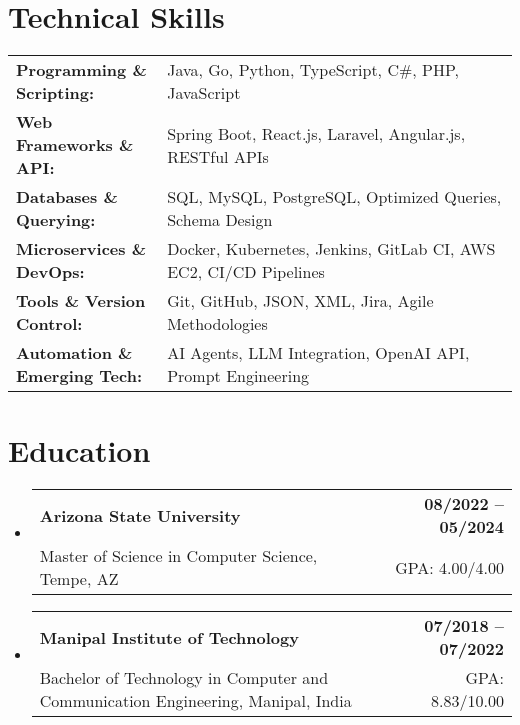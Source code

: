 \documentclass[letterpaper,11pt]{article}
\makeatletter
\newcommand{\educationSubheading}[4]{
  \vspace{-2pt}\item
    \begin{tabular*}{1.0\textwidth}[t]{l@{\extracolsep{\fill}}r}
      \textbf{\small #1} & \textbf{\small #2} \\
      {\small#3} & {\small #4} \\
    \end{tabular*}\vspace{-7pt}
}
\newcommand{\resumeSubHeadingListStart}{\begin{itemize}[leftmargin=0pt, label={}]}
\newcommand{\resumeSubHeadingListEnd}{\end{itemize}}
\makeatother
\begin{document}
\section{Technical Skills}
        \vspace{-14pt}
        \begin{table}[h]
            \footnotesize
            \begin{tabular}{p{0.3\linewidth} p{0.7\linewidth}}
                \textbf{Programming \& Scripting:} & Java, Go, Python, TypeScript, C\#, PHP, JavaScript \\
                \textbf{Web Frameworks \& API:} & Spring Boot, React.js, Laravel, Angular.js, RESTful APIs \\
                \textbf{Databases \& Querying:} & SQL, MySQL, PostgreSQL, Optimized Queries, Schema Design \\
                \textbf{Microservices \& DevOps:} & Docker, Kubernetes, Jenkins, GitLab CI, AWS EC2, CI/CD Pipelines \\
                \textbf{Tools \& Version Control:} & Git, GitHub, JSON, XML, Jira, Agile Methodologies \\
                \textbf{Automation \& Emerging Tech:} & AI Agents, LLM Integration, OpenAI API, Prompt Engineering \\
            \end{tabular}
        \end{table}

 \vspace{-15pt}

\section{Education}
  \resumeSubHeadingListStart
    \educationSubheading
      {Arizona State University}{08/2022 -- 05/2024}
      {Master of Science in Computer Science, Tempe, AZ}{GPA: 4.00/4.00}

    \educationSubheading
      {Manipal Institute of Technology}{07/2018 -- 07/2022}
      {Bachelor of Technology in Computer and Communication Engineering, Manipal, India}{GPA: 8.83/10.00}
  \resumeSubHeadingListEnd
\end{document}
